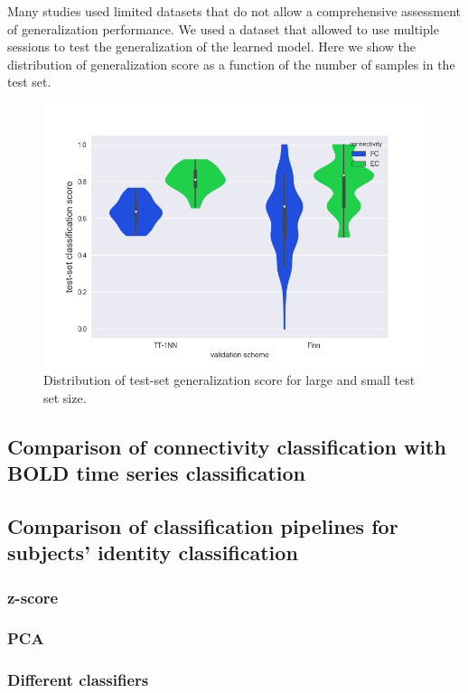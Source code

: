 \documentclass[12pt, a4paper, final, fleqn]{article}
\begin{document}
Many studies used limited datasets that do not allow a comprehensive assessment of generalization performance.
We used a dataset that allowed to use multiple sessions to test the generalization of the learned model.
Here we show the distribution of generalization score as a function of the number of samples in the test set.
\begin{figure}[!htb]
\begin{center}
\includegraphics[width=0.89\columnwidth]{variability_finn_1nn_violins_hues}
  \caption[Variability of generalization score]{Distribution of test-set generalization score for large and small test set size.
	  \label{fig:variability_score}}
\end{center}
\end{figure}

\subsection{Comparison of connectivity classification with BOLD time series classification}

\subsection{Comparison of classification pipelines for subjects' identity classification}
\subsubsection{z-score}
\subsubsection{PCA}
\subsubsection{Different classifiers}
\end{document}
